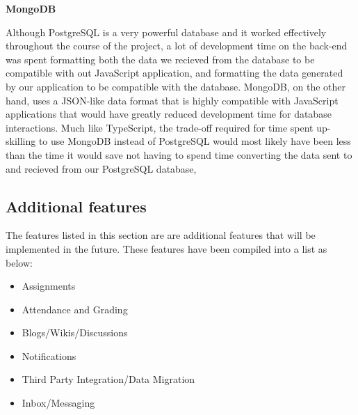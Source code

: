 \textbf{MongoDB}

Although PostgreSQL is a very powerful database and it worked effectively throughout the course of the project, a lot of development time on the back-end was spent formatting both the data we recieved from the database to be compatible with out JavaScript application, and formatting the data generated by our application to be compatible with the database. MongoDB, on the other hand, uses a JSON-like data format that is highly compatible with JavaScript applications that would have greatly reduced development time for database interactions. Much like TypeScript, the trade-off required for time spent up-skilling to use MongoDB instead of PostgreSQL would most likely have been less than the time it would save not having to spend time converting the data sent to and recieved from our PostgreSQL database, 

\subsection{Additional features}
The features listed in this section are are additional features that will be implemented in the future. These features have been compiled into a list as below: 

\begin{itemize}
  \item Assignments
  \item Attendance and Grading
  \item Blogs/Wikis/Discussions
  \item Notifications
  \item Third Party Integration/Data Migration
  \item Inbox/Messaging
\end{itemize}
